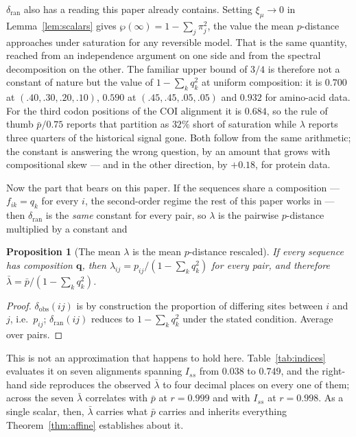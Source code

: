 \documentclass[preprint,12pt,authoryear]{elsarticle}
\newcommand{\Iss}{I_{ss}}
\newtheorem{proposition}[theorem]{Proposition}
\theoremstyle{definition}
\theoremstyle{remark}
\begin{document}
$\delta_{\mathrm{ran}}$ also has a reading this paper already contains.
Setting $\xi_\mu\to0$ in Lemma~\ref{lem:scalars} gives
$\wp(\infty)=1-\sum_j\pi_j^2$, the value the mean $p$-distance approaches
under saturation for any reversible model. That is the same quantity, reached
from an independence argument on one side and from the spectral decomposition
on the other. The familiar upper bound of $3/4$ is therefore not a constant
of nature but the value of $1-\sum_kq_k^2$ at uniform composition: it is
$0.700$ at $(.40,.30,.20,.10)$, $0.590$ at $(.45,.45,.05,.05)$ and $0.932$
for amino-acid data. For the third codon positions of the COI alignment it is
$0.684$, so the rule of thumb $\bar p/0.75$ reports that partition as $32\%$
short of saturation while $\lambda$ reports three quarters of the historical
signal gone. Both follow from the same arithmetic; the constant is answering
the wrong question, by an amount that grows with compositional skew --- and in
the other direction, by $+0.18$, for protein data.

Now the part that bears on this paper. If the sequences share a composition
--- $f_{ik}=q_k$ for every $i$, the second-order regime the rest of this
paper works in --- then $\delta_{\mathrm{ran}}$ is the \emph{same} constant
for every pair, so $\lambda$ is the pairwise $p$-distance multiplied by a
constant and

\begin{proposition}[The mean $\lambda$ is the mean $p$-distance rescaled]
\label{prop:lambda}
If every sequence has composition $\mathbf q$, then
$\lambda_{ij}=p_{ij}/(1-\sum_k q_k^2)$ for every pair, and therefore
$\bar\lambda=\bar p/(1-\sum_k q_k^2)$.
\end{proposition}

\begin{proof}
$\delta_{\mathrm{obs}}(ij)$ is by construction the proportion of differing
sites between $i$ and $j$, i.e.\ $p_{ij}$; $\delta_{\mathrm{ran}}(ij)$ reduces
to $1-\sum_kq_k^2$ under the stated condition. Average over pairs.
\end{proof}

This is not an approximation that happens to hold here.
Table~\ref{tab:indices} evaluates it on seven alignments spanning $\Iss$ from
$0.038$ to $0.749$, and the right-hand side reproduces the observed
$\bar\lambda$ to four decimal places on every one of them; across the seven
$\bar\lambda$ correlates with $\bar p$ at $r=0.999$ and with $\Iss$ at
$r=0.998$. As a single scalar, then, $\bar\lambda$ carries what $\bar p$
carries and inherits everything Theorem~\ref{thm:affine} establishes about it.
\end{document}
